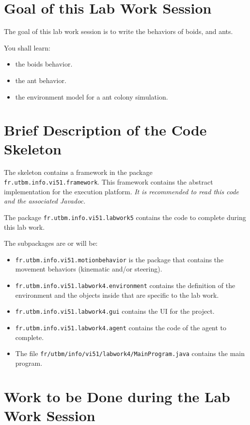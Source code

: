 \documentclass[article,english,nodocumentinfo]{multiagentfrreport}
\begin{document}
\section{Goal of this Lab Work Session}

The goal of this lab work session is to write the behaviors of boids, and ants.

You shall learn: 
\begin{itemize}
\item the boids behavior.
\item the ant behavior.
\item the environment model for a ant colony simulation.
\end{itemize}



\section{Brief Description of the Code Skeleton}

The skeleton contains a framework in the package \texttt{fr.utbm.info.vi51.framework}.
This framework contains the abstract implementation for the execution platform.
\emph{It is recommended to read this code and the associated Javadoc.}

The package \texttt{fr.utbm.info.vi51.labwork5} contains the code to complete during this lab work.

The subpackages are or will be:
\begin{itemize}
\item \texttt{fr.utbm.info.vi51.motionbehavior} is the package that contains the movement behaviors (kinematic and/or steering).
\item \texttt{fr.utbm.info.vi51.labwork4.environment} contains the definition of the environment and the objects inside that are specific to the lab work.
\item \texttt{fr.utbm.info.vi51.labwork4.gui} contains the UI for the project.
\item \texttt{fr.utbm.info.vi51.labwork4.agent} contains the code of the agent to complete.
\item The file \texttt{fr/utbm/info/vi51/labwork4/MainProgram.java} contains the main program.
\end{itemize}

\section{Work to be Done during the Lab Work Session}
\end{document}
